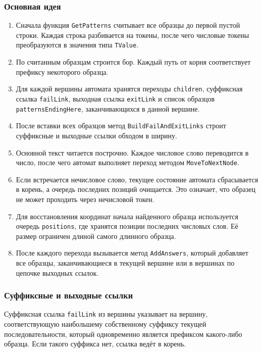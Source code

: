 \documentclass[12pt]{article}
\begin{document}
\subsubsection*{Основная идея}
\begin{enumerate}
    \item Сначала функция \texttt{GetPatterns} считывает все образцы до первой пустой строки. Каждая строка разбивается на токены, после чего числовые токены преобразуются в значения типа \texttt{TValue}.
    \item По считанным образцам строится бор. Каждый путь от корня соответствует префиксу некоторого образца.
    \item Для каждой вершины автомата хранятся переходы \texttt{children}, суффиксная ссылка \texttt{failLink}, выходная ссылка \texttt{exitLink} и список образцов \texttt{patternsEndingHere}, заканчивающихся в данной вершине.
    \item После вставки всех образцов метод \texttt{BuildFailAndExitLinks} строит суффиксные и выходные ссылки обходом в ширину.
    \item Основной текст читается построчно. Каждое числовое слово переводится в число, после чего автомат выполняет переход методом \texttt{MoveToNextNode}.
    \item Если встречается нечисловое слово, текущее состояние автомата сбрасывается в корень, а очередь последних позиций очищается. Это означает, что образец не может проходить через нечисловой токен.
    \item Для восстановления координат начала найденного образца используется очередь \texttt{positions}, где хранятся позиции последних числовых слов. Её размер ограничен длиной самого длинного образца.
    \item После каждого перехода вызывается метод \texttt{AddAnswers}, который добавляет все образцы, заканчивающиеся в текущей вершине или в вершинах по цепочке выходных ссылок.
\end{enumerate}

\subsubsection*{Суффиксные и выходные ссылки}
\hspace{2ex}
Суффиксная ссылка \texttt{failLink} из вершины указывает на вершину, соответствующую наибольшему собственному суффиксу текущей последовательности, который одновременно является префиксом какого-либо образца. Если такого суффикса нет, ссылка ведёт в корень.
\end{document}
